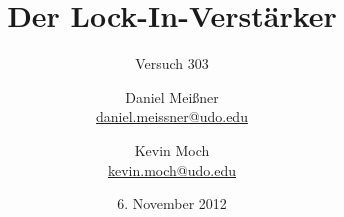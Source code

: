 


\newcommand{\name}[1]{\textsc{#1}}

\titlehead{{TU Dortmund \hfill WS~12/13\\}
Fakultät Physik\\
Experimentelle Übungen I}

\subject{Versuchsprotokoll}
\title{Der Lock-In-Verstärker}
\subtitle{Versuch 303}

\author{Daniel Meißner\\
{\normalsize\url{daniel.meissner@udo.edu}}
\and
Kevin Moch\\
{\normalsize\url{kevin.moch@udo.edu}}}

\date{6. November 2012}


\maketitle

\tableofcontents
\clearpage











